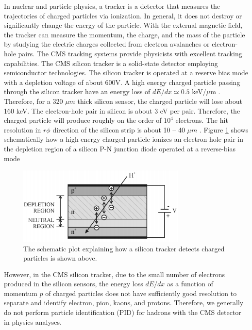 In nuclear and particle physics, a tracker is a detector that measures the trajectories of charged particles via ionization. In general, it does not destroy or significantly change the energy of the particle. With the external magnetic field, the tracker can measure the momentum, the charge, and the mass of the particle by studying the electric charges collected from electron avalanches or electron-hole pairs. The CMS tracking systems provide physicists with excellent tracking capabilities. The CMS silicon tracker is a solid-state detector employing semiconductor technologies. The silicon tracker is operated at a reserve bias mode with a depletion voltage of about 600V. A high energy charged particle passing through the silicon tracker have an energy loss of $dE/dx \simeq 0.5$ keV/$\mu$m \cite{AlphaTheoEx}. Therefore, for a 320 $\mu m$ thick silicon sensor, the charged particle will lose about 160 keV. The electron-hole pair in silicon is about 3 eV per pair. Therefore, the charged particle will produce roughly on the order of $10^4$ electrons. The hit resolution in $r\phi$ direction of the silicon strip is about 10 -- 40 $\mu m$ \cite{CMSTrackComp}. Figure \ref{SiliconDetector} shows schematically how a high-energy charged particle ionizes an electron-hole pair in the depletion region of a silicon P-N junction diode operated at a reverse-bias mode


\begin{figure}[hbtp]
\begin{center}
\includegraphics[width=0.75\textwidth]{Figures/Chapter3/SiliconDetector.png}
\caption{The schematic plot explaining how a silicon tracker detects charged particles is shown above.}
\label{SiliconDetector}
\end{center}
\end{figure} 

However, in the CMS silicon tracker, due to the small number of electrons produced in the silicon sensors, the energy loss $dE/dx$ as a function of momentum $p$ of charged particles does not have sufficiently good resolution to separate and identify electron, pion, kaons, and protons. Therefore, we generally do not perform particle identification (PID) for hadrons with the CMS detector in physics analyses.  

